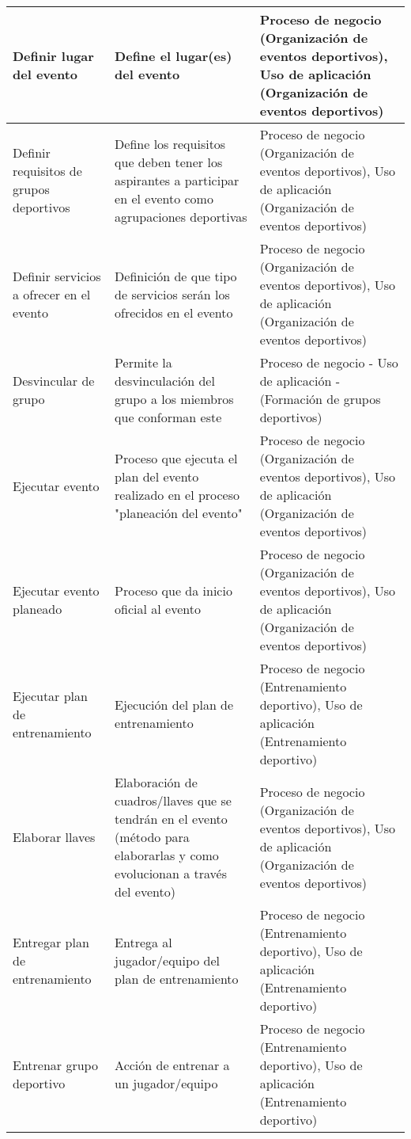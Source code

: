 \begin{center}
\begin{longtable}{|p{4cm}|p{7cm}|p{4cm}|}
		\\
		\hline
		Definir lugar del evento & 
		Define el lugar(es) del evento & 
		Proceso de negocio (Organización de eventos deportivos), Uso de aplicación (Organización de eventos deportivos)
		\\
		\hline
		Definir requisitos de grupos deportivos & 
		Define los requisitos que deben tener los aspirantes a participar en el evento como agrupaciones deportivas & 
		Proceso de negocio (Organización de eventos deportivos), Uso de aplicación (Organización de eventos deportivos)
		\\
		\hline
		Definir servicios a ofrecer en el evento & 
		Definición de que tipo de servicios serán los ofrecidos en el evento & 
		Proceso de negocio (Organización de eventos deportivos), Uso de aplicación (Organización de eventos deportivos)
		\\
		\hline
		Desvincular de grupo & 
		Permite la desvinculación del grupo a los miembros que conforman este & 
		Proceso de negocio - Uso de aplicación - (Formación de grupos deportivos)
		\\
		\hline
		Ejecutar evento & 
		Proceso que ejecuta el plan del evento realizado en el proceso "planeación del evento" & 
		Proceso de negocio (Organización de eventos deportivos), Uso de aplicación (Organización de eventos deportivos)
		\\
		\hline
		Ejecutar evento planeado & 
		Proceso que da inicio oficial al evento & 
		Proceso de negocio (Organización de eventos deportivos), Uso de aplicación (Organización de eventos deportivos)
		\\
		\hline
		Ejecutar plan de entrenamiento & 
		Ejecución del plan de entrenamiento & 
		Proceso de negocio (Entrenamiento deportivo), Uso de aplicación (Entrenamiento deportivo)
		\\
		\hline
		Elaborar llaves & 
		Elaboración de cuadros/llaves que se tendrán en el evento (método para elaborarlas y como evolucionan a través del evento) & 
		Proceso de negocio (Organización de eventos deportivos), Uso de aplicación (Organización de eventos deportivos)
		\\
		\hline
		Entregar plan de entrenamiento & 
		Entrega al jugador/equipo del plan de entrenamiento & 
		Proceso de negocio (Entrenamiento deportivo), Uso de aplicación (Entrenamiento deportivo)
		\\
		\hline
		Entrenar grupo deportivo & 
		Acción de entrenar a un jugador/equipo & 
		Proceso de negocio (Entrenamiento deportivo), Uso de aplicación (Entrenamiento deportivo)

\end{longtable}
\end{center}
